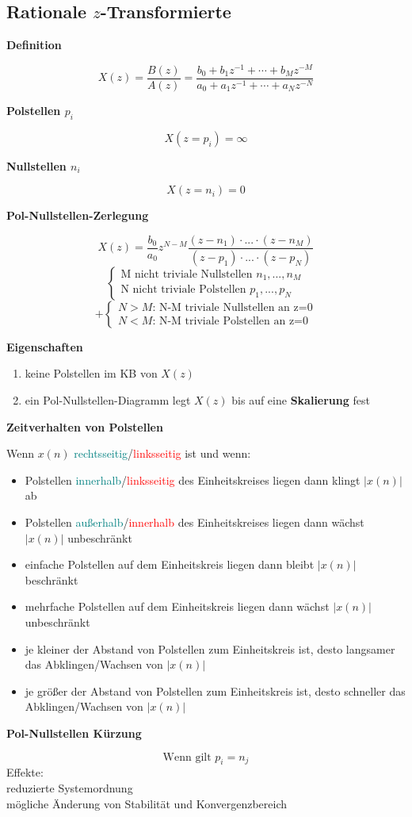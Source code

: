 \documentclass[10pt,a4paper]{article}
\newcommand{\fancyformula}[2]{
	\small\raggedright{\sffamily\textbf{#1}}
	#2
}
\begin{document}
\subsection*{Rationale $z$-Transformierte}
\begin{multicols}{2}
	\fancyformula{Definition}{
	\[X(z)=\dfrac{B(z)}{A(z)}=\dfrac{b_{0}+b_{1}z^{-1}+\cdots+b_{M}z^{-M}}{a_{0}+a_{1}z^{-1}+\cdots+a_{N}z^{-N}}\]
	}
	\fancyformula{Polstellen $p_{i}$}{
		\[X(z=p_{i})=\infty\]
	}
	\fancyformula{Nullstellen $n_{i}$}{
	\[X(z=n_{i})=0\]
	}
	\fancyformula{Pol-Nullstellen-Zerlegung}{
	\[X(z)=\frac{b_{0}}{a_{0}}z^{N-M}\dfrac{(z-n_{1})\cdot...\cdot(z-n_{M})}{(z-p_{1})\cdot...\cdot(z-p_{N})}\]
	\[\begin{cases}
	\text{M nicht triviale Nullstellen } n_{1},...,n_{M}\\
	\text{N nicht triviale Polstellen } p_{1},...,p_{N}
	\end{cases}\]
	\[+\begin{cases}
	N>M\text{: N-M triviale Nullstellen an z=0}\\
	N<M \text{: N-M triviale Polstellen an z=0}
	\end{cases}\]
	}
	\fancyformula{Eigenschaften}{
	\begin{enumerate}
		\item keine Polstellen im KB von $X(z)$
		\item ein Pol-Nullstellen-Diagramm legt $X(z)$ bis auf eine \textbf{Skalierung} fest
	\end{enumerate}
	}
	\fancyformula{Zeitverhalten von Polstellen}{
	Wenn $x(n)$ \textcolor{teal}{rechtsseitig}/\textcolor{red}{linksseitig} ist und wenn:
	\begin{itemize}
		\item Polstellen \textcolor{teal}{innerhalb}/\textcolor{red}{linksseitig} des Einheitskreises liegen dann klingt $|x(n)|$ ab
		\item Polstellen \textcolor{teal}{außerhalb}/\textcolor{red}{innerhalb} des Einheitskreises liegen dann wächst $|x(n)|$ unbeschränkt
		\item einfache Polstellen auf dem Einheitskreis liegen dann bleibt $|x(n)|$ beschränkt
		\item mehrfache Polstellen auf dem Einheitskreis liegen dann wächst $|x(n)|$ unbeschränkt
		\item je kleiner der Abstand von Polstellen zum Einheitskreis ist, desto langsamer das Abklingen/Wachsen von  $|x(n)|$
		\item je größer der Abstand von Polstellen zum Einheitskreis ist, desto schneller das Abklingen/Wachsen von $|x(n)|$
	\end{itemize}
	}
	\fancyformula{Pol-Nullstellen Kürzung}{
	\[\text{Wenn gilt } p_{i}=n_{j}\]
	Effekte: \\
	reduzierte Systemordnung\\
	mögliche Änderung von Stabilität und Konvergenzbereich
	}
\end{multicols}
\end{document}
